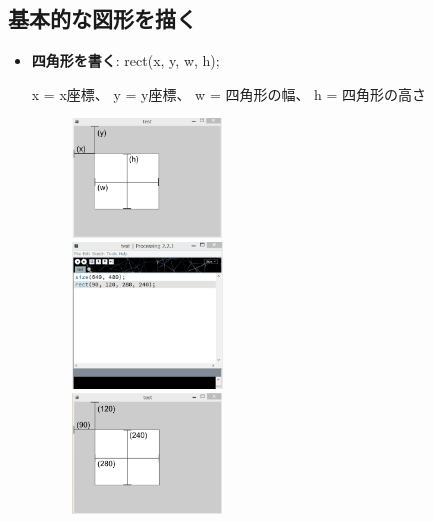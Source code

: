 \documentclass[11pt,a4paper]{jarticle}
\begin{document}
\subsection*{基本的な図形を描く}

\begin{itemize}
 \item \textbf{四角形を書く}: rect(x, y, w, h);

       x = x座標、
       y = y座標、
       w = 四角形の幅、
       h = 四角形の高さ

\begin{figure}[htbp]
 \begin{minipage}{0.325\hsize}
  \begin{center}
   \includegraphics[width=40mm]{image_of_rect_function.eps}
  \end{center}
 \end{minipage}
 \begin{minipage}{0.325\hsize}
 \begin{center}
  \includegraphics[width=40mm]{Processing_img1-1.eps}
 \end{center}
 \end{minipage}
 \begin{minipage}{0.325\hsize}
 \begin{center}
  \includegraphics[width=40mm]{example_of_rect_function.eps}
 \end{center}
 \end{minipage}
\end{figure}


\end{itemize}
\end{document}
